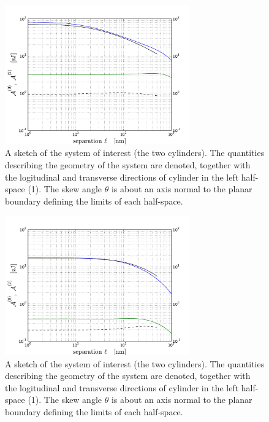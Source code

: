 \documentclass[onecolumn,letterpaper,amsmath,amssymb,floatfix,aps,superscriptaddress]{revtex4}
\begin{document}
\begin{figure}
\centerline{\includegraphics[width=8cm]{140309_93w93_GH_skew_ret_A0_A2.pdf}}
\caption{A sketch of the system of interest (the two cylinders). The quantities describing the geometry of the system are 
denoted, together with the logitudinal and transverse directions of cylinder in the left half-space (1). The skew angle $\theta$ is about an axis normal to the planar boundary defining the limits of each half-space.
}
\label{fig:sketch}
\end{figure}

\begin{figure}
\centerline{\includegraphics[width=8cm]{140309_290w290_GH_skew_ret_A0_A2.pdf}}
\caption{A sketch of the system of interest (the two cylinders). The quantities describing the geometry of the system are 
denoted, together with the logitudinal and transverse directions of cylinder in the left half-space (1). The skew angle $\theta$ is about an axis normal to the planar boundary defining the limits of each half-space.
}
\label{fig:sketch}
\end{figure}
\end{document}
